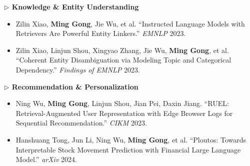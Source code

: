 \documentclass[10.5pt,letterpaper]{article}
\begin{document}
\noindent\textcolor{blue!60!black}{\textbf{$\triangleright$ Knowledge \& Entity Understanding}}
\begin{itemize}
  \item Zilin Xiao, \textbf{Ming Gong}, Jie Wu, et al. ``Instructed Language Models with Retrievers Are Powerful Entity Linkers.'' \textit{EMNLP} 2023.
  \item Zilin Xiao, Linjun Shou, Xingyao Zhang, Jie Wu, \textbf{Ming Gong}, et al. ``Coherent Entity Disambiguation via Modeling Topic and Categorical Dependency.'' \textit{Findings of EMNLP} 2023.
\end{itemize}

\noindent\textcolor{blue!60!black}{\textbf{$\triangleright$ Recommendation \& Personalization}}
\begin{itemize}
  \item Ning Wu, \textbf{Ming Gong}, Linjun Shou, Jian Pei, Daxin Jiang. ``RUEL: Retrieval-Augmented User Representation with Edge Browser Logs for Sequential Recommendation.'' \textit{CIKM} 2023.
  \item Hanshuang Tong, Jun Li, Ning Wu, \textbf{Ming Gong}, et al. ``Ploutos: Towards Interpretable Stock Movement Prediction with Financial Large Language Model.'' \textit{arXiv} 2024.
\end{itemize}

\end{document}
